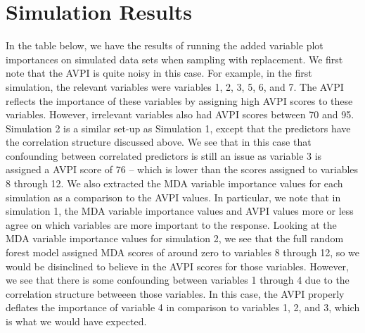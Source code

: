 \documentclass[12pt,twoside]{reedthesis}
\theoremstyle{definition}
\theoremstyle{definition}
\theoremstyle{definition}
\theoremstyle{remark}
\begin{document}
\section{Simulation Results}\label{simulation-results}

In the table below, we have the results of running the added variable
plot importances on simulated data sets when sampling with replacement.
We first note that the AVPI is quite noisy in this case. For example, in
the first simulation, the relevant variables were variables 1, 2, 3, 5,
6, and 7. The AVPI reflects the importance of these variables by
assigning high AVPI scores to these variables. However, irrelevant
variables also had AVPI scores between 70 and 95. Simulation 2 is a
similar set-up as Simulation 1, except that the predictors have the
correlation structure discussed above. We see that in this case that
confounding between correlated predictors is still an issue as variable
3 is assigned a AVPI score of 76 -- which is lower than the scores
assigned to variables 8 through 12. We also extracted the MDA variable
importance values for each simulation as a comparison to the AVPI
values. In particular, we note that in simulation 1, the MDA variable
importance values and AVPI values more or less agree on which variables
are more important to the response. Looking at the MDA variable
importance values for simulation 2, we see that the full random forest
model assigned MDA scores of around zero to variables 8 through 12, so
we would be disinclined to believe in the AVPI scores for those
variables. However, we see that there is some confounding between
variables 1 through 4 due to the correlation structure betweeen those
variables. In this case, the AVPI properly deflates the importance of
variable 4 in comparison to variables 1, 2, and 3, which is what we
would have expected.
\end{document}
